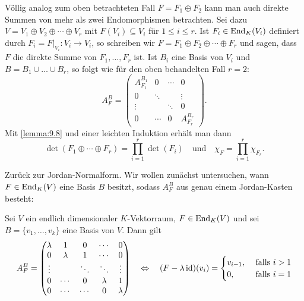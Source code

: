 Völlig analog zum oben betrachteten Fall $F = F_1 \oplus F_2$ kann man auch direkte Summen von mehr als zwei Endomorphismen betrachten.
Sei dazu $V = V_1 \oplus V_2 \oplus \cdots \oplus V_r$ mit $F(V_i) \subseteq V_i$ für $1 \leq i \leq r$.
Ist $F_i \in \operatorname{End}_K(V_i)$ definiert durch $F_i = F\big|_{V_i}\colon V_i \rightarrow V_i$, so schreiben wir $F = F_1 \oplus F_2 \oplus \cdots \oplus F_r$ und sagen, dass $F$ die direkte Summe von $F_1,\dots,F_r$ ist.
Ist $B_i$ eine Basis von $V_i$ und $B = B_1 \cup \dots \cup B_r$, so folgt wie für den oben behandelten Fall $r=2$:
\[
	A_F^B = \begin{pmatrix}
		A_{F_1}^{B_1} & 0 & \cdots & 0 \\
		0 & \ddots & & \vdots \\
		\vdots & & \ddots & 0 \\
		0 & \cdots & 0 & A_{F_r}^{B_r}
	\end{pmatrix}.
\]
Mit \autoref{lemma:9.8} und einer leichten Induktion erhält man dann
\begin{equation}
	\det(F_1 \oplus \cdots \oplus F_r) = \prod_{i=1}^{r} \det(F_i) \quad \text{und} \quad \chi_F = \prod_{i=1}^{r} \chi_{F_r}. \label{eq:9.1}
\end{equation}

Zurück zur Jordan-Normalform.
Wir wollen zunächst untersuchen, wann $F \in \operatorname{End}_K(V)$ eine Basis $B$ besitzt, sodass $A_F^B$ aus genau einem Jordan-Kasten besteht:

\begin{lemma}
	\label{lemma:9.9}
	Sei $V$ ein endlich dimensionaler $K$-Vektorraum, $F \in \operatorname{End}_K(V)$ und sei $B = \{v_1,\dots,v_k\}$ eine Basis von $V$.
	Dann gilt
	\begin{equation}
		A_F^B = \begin{pmatrix}
		\lambda & 1 & 0 & \cdots & 0 \\ 
		0 & \lambda & 1 & \cdots & 0 \\ 
		\vdots &  & \ddots & \ddots & \vdots \\ 
		0 & \cdots & 0 & \lambda & 1 \\ 
		0 & \cdots & \cdots & 0 & \lambda
		\end{pmatrix} \quad \Leftrightarrow \quad (F-\lambda \operatorname{id})(v_i) = \begin{cases}
			v_{i-1}, & \text{ falls } i > 1 \\
			0, & \text{ falls } i = 1
		\end{cases} \label{eq:9.2}
	\end{equation}
\end{lemma}


